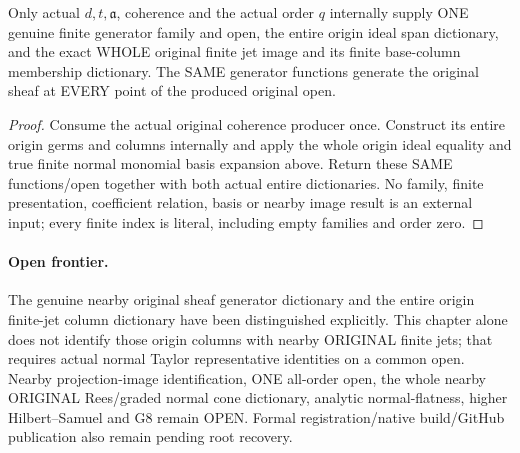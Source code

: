 \begin{theorem}
\label{hir:relative-normal-original-jet-coherent-consumer}
\leanok
{}
Only actual $d,t,\mathfrak a$, coherence and the actual order $q$ internally
supply ONE genuine finite generator family and open, the entire origin ideal
span dictionary, and the exact WHOLE original finite jet image and its finite
base-column membership dictionary. The SAME generator functions generate the
original sheaf at EVERY point of the produced original open.
\end{theorem}
\begin{proof}
Consume the actual original coherence producer once. Construct its entire
origin germs and columns internally and apply the whole origin ideal equality
and true finite normal monomial basis expansion above. Return these SAME
functions/open together with both actual entire dictionaries. No family,
finite presentation, coefficient relation, basis or nearby image result is an
external input; every finite index is literal, including empty families and
order zero.
\end{proof}

\paragraph{Open frontier.}
The genuine nearby original sheaf generator dictionary and the entire origin
finite-jet column dictionary have been distinguished explicitly. This chapter
alone does not identify those origin columns with nearby ORIGINAL finite jets;
that requires actual normal Taylor representative identities on a common open.
Nearby projection-image identification, ONE all-order open, the whole nearby
ORIGINAL Rees/graded normal cone dictionary, analytic normal-flatness, higher
Hilbert--Samuel and G8 remain OPEN. Formal registration/native build/GitHub
publication also remain pending root recovery.
